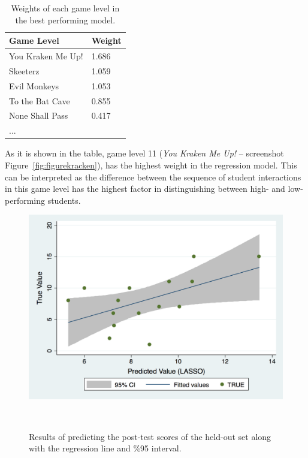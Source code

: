 \documentclass{sigchi}
\begin{document}
\begin{table}[b]
	\centering
	\begin{tabular}{ll}
		\hline
		\textbf{Game Level} & \textbf{Weight} \\ \hline
		You Kraken Me Up!   & 1.686                               \\
		Skeeterz            & 1.059                               \\
		Evil Monkeys        & 1.053                               \\
		To the Bat Cave     & 0.855                               \\
		None Shall Pass     & 0.417                               \\
		...                 &                                    
	\end{tabular}
	\caption{Weights of each game level in the best performing model.}
	\label{tab:regrweights}	
\end{table}

As it is shown in the table, game level 11 (\textit{You Kraken Me Up!} -- screenshot Figure~\ref{fig:figurekracken}), has the highest weight in the regression model. This can be interpreted as the difference between the sequence of student interactions in this game level has the highest factor in distinguishing between high- and low-performing students. 

\begin{figure}
	\centering
	\includegraphics[width=0.9\columnwidth]{figures/regression.png}
	\caption{Results of predicting the post-test scores of the held-out set along with the regression line and \%95 interval.}~\label{fig:regression}
\end{figure}
	
\end{document}
